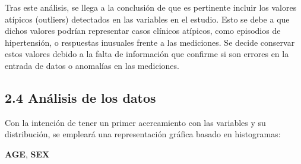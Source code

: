 \documentclass[
]{article}
\newenvironment{Shaded}{\begin{snugshade}}{\end{snugshade}}
\newcommand{\AttributeTok}[1]{\textcolor[rgb]{0.13,0.29,0.53}{#1}}
\newcommand{\CommentTok}[1]{\textcolor[rgb]{0.56,0.35,0.01}{\textit{#1}}}
\newcommand{\DecValTok}[1]{\textcolor[rgb]{0.00,0.00,0.81}{#1}}
\newcommand{\FunctionTok}[1]{\textcolor[rgb]{0.13,0.29,0.53}{\textbf{#1}}}
\newcommand{\NormalTok}[1]{#1}
\newcommand{\OtherTok}[1]{\textcolor[rgb]{0.56,0.35,0.01}{#1}}
\newcommand{\SpecialCharTok}[1]{\textcolor[rgb]{0.81,0.36,0.00}{\textbf{#1}}}
\newcommand{\StringTok}[1]{\textcolor[rgb]{0.31,0.60,0.02}{#1}}
\begin{document}
Tras este análisis, se llega a la conclusión de que es pertinente
incluir los valores atípicos (outliers) detectados en las variables en
el estudio. Esto se debe a que dichos valores podrían representar casos
clínicos atípicos, como episodios de hipertensión, o respuestas
inusuales frente a las mediciones. Se decide conservar estos valores
debido a la falta de información que confirme si son errores en la
entrada de datos o anomalías en las mediciones.

\hypertarget{anuxe1lisis-de-los-datos}{%
\subsection{2.4 Análisis de los datos}\label{anuxe1lisis-de-los-datos}}

Con la intención de tener un primer acercamiento con las variables y su
distribución, se empleará una representación gráfica basado en
histogramas:

\textbf{AGE}, \textbf{SEX}

\begin{Shaded}
\end{Shaded}
\end{document}
